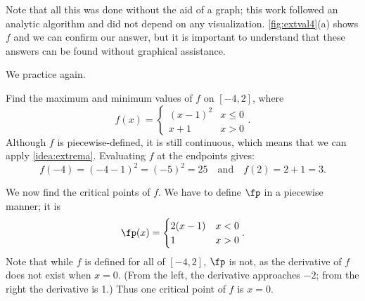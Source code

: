 Note that all this was done without the aid of a graph; this work followed an analytic algorithm and did not depend on any visualization. \autoref{fig:extval4}(a) shows $f$ and we can confirm our answer, but it is important to  understand that these answers can be found without graphical assistance.

We practice again.

\begin{example}\label{ex_extval5}
Find the maximum and minimum values of $f$ on $[-4,2]$, where
\[f(x) = \begin{cases} (x-1)^2 & x\leq 0 \\ x+1 & x>0 \end{cases}.\]
%
%
\solution
Although $f$ is piecewise-defined, it is still continuous, which means that we can apply \autoref{idea:extrema}. Evaluating $f$ at the endpoints gives: 
\[f(-4)=(-4-1)^2=(-5)^2 = 25 \quad \text{and} \quad f(2)=2+1 = 3.\]

We now find the critical points of $f$. We have to define $\fp$ in a piecewise manner; it is
\[\fp(x) =\begin{cases} 2(x-1) & x < 0 \\ 1 & x>0 \end{cases} .\]
Note that while $f$ is defined for all of $[-4,2]$, $\fp$ is not, as the derivative of $f$ does not exist when $x=0$. (From the left, the derivative approaches $-2$; from the right the derivative is 1.) Thus one critical point of $f$ is $x=0$.


\end{example}
